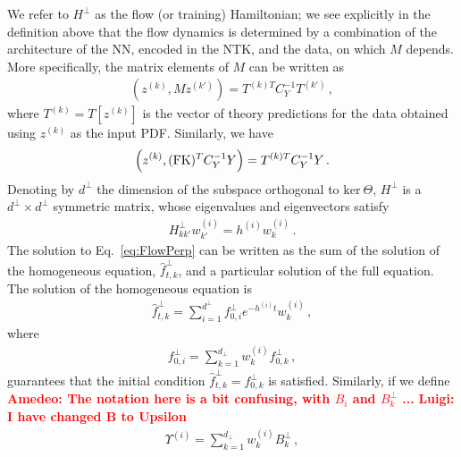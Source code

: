\documentclass[11pt]{article}
\newcommand{\ldd}[1]{\textcolor{red}{\textbf{Luigi: #1}}}
\newcommand{\ac}[1]{\textcolor{red}{\textbf{Amedeo: #1}}}
\begin{document}
We refer to $H^\perp$ as the flow (or training) Hamiltonian; we see explicitly in the definition above that
the flow dynamics is determined by a combination of the architecture of the NN, encoded in the NTK, and the
data, on which $M$ depends. More specifically, the matrix elements of $M$ can be written as
\begin{align}
    \label{eq:MMatElems}
    \left(z^{(k)}, M z^{(k')}\right) = T^{(k)T} C_Y^{-1} T^{(k')}\, ,
\end{align}
where $T^{(k)} = T[z^{(k)}]$ is the vector of theory predictions for the data obtained using $z^{(k)}$ as the
input PDF. Similarly, we have
\begin{align}
    \label{eq:BMatElems}
    \left(z^{(k)}, (\mathrm{FK})^T C_Y^{-1} Y\right) = T^{(k)T} C_Y^{-1} Y\, .
\end{align}
Denoting by $d^\perp$ the dimension of the subspace orthogonal to $\text{ker}\ \Theta$, $H^\perp$ is
a $d^\perp\times d^\perp$ symmetric matrix, whose eigenvalues and eigenvectors satisfy
\begin{align}
    H^\perp_{kk'} w^{(i)}_{k'} = h^{(i)} w^{(i)}_{k}\, .
\end{align}
The solution to Eq.~\eqref{eq:FlowPerp} can be written as the sum of the solution of the
homogeneous equation, $\hat{f}^{\perp}_{t,k}$, and a particular solution of the full equation.
The solution of the homogeneous equation is
\begin{align}
    \label{eq:HomoSoln}
    \hat{f}^{\perp}_{t,k} = \sum_{i=1}^{d^\perp} f^{\perp}_{0,i} e^{-h^{(i)}t} w^{(i)}_k\, ,
\end{align}
where
\begin{align}
    \label{eq:InitialCi}
    f^{\perp}_{0,i} = \sum_{k=1}^{d_\perp} w^{(i)}_k f^\perp_{0,k}\, ,
\end{align}
guarantees that the initial condition $\hat{f}^\perp_{t,k}=f^\perp_{0,k}$ is
satisfied. Similarly, if we define
\ac{The notation here is a bit confusing, with $B_i$ and $B^\perp_k$ ...}
\ldd{I have changed B to Upsilon}
\begin{align}
    \label{eq:BiDef}
    \Upsilon^{(i)} = \sum_{k=1}^{d_\perp} w^{(i)}_k B^\perp_{k}\, ,
\end{align}
\end{document}
